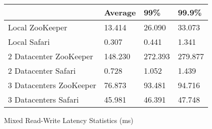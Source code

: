 \begin{figure}[h]
  \caption{Mixed Read-Write Latency Statistics (ms)}
  \begin{center}
    \begin{tabular}{| l | l | l | l |}
    \hline
    & Average & 99\% & 99.9\% \\ \hline
    Local ZooKeeper & 13.414 & 26.090 & 33.073 \\ \hline
    Local Safari & 0.307 & 0.441 & 1.341 \\ \hline\hline
    2 Datacenter ZooKeeper & 148.230 & 272.393 & 279.877 \\ \hline
    2 Datacenter Safari & 0.728 & 1.052 & 1.439 \\ \hline\hline
    3 Datacenters ZooKeeper & 76.873 & 93.481 & 94.716 \\ \hline
    3 Datacenters Safari & 45.981 & 46.391 & 47.748 \\
    \hline
    \end{tabular}
  \end{center}
\end{figure}
